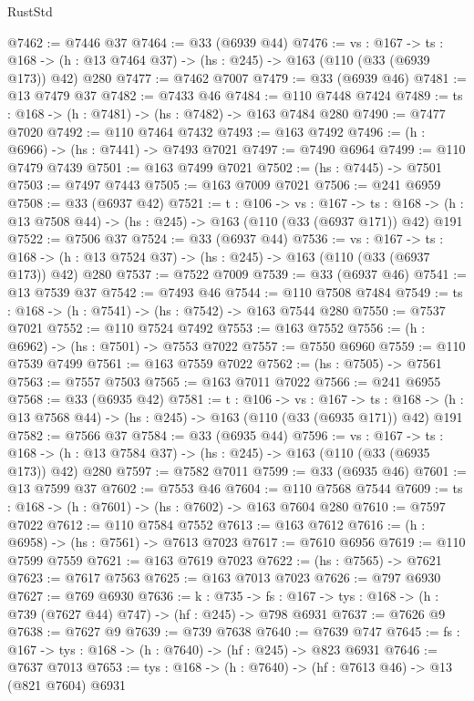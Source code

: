 \begin{lexlean}{RustStd}
\begin{coremodule}
@7462 := @7446 @37
@7464 := @33 (@6939 @44)
@7476 := {vs : @167} ->
  {ts : @168} -> (h : @13 @7464 @37) -> (hs : @245) -> @163 (@110 (@33 (@6939 @173)) @42) @280
@7477 := @7462 @7007
@7479 := @33 (@6939 @46)
@7481 := @13 @7479 @37
@7482 := @7433 @46
@7484 := @110 @7448 @7424
@7489 := {ts : @168} -> (h : @7481) -> (hs : @7482) -> @163 @7484 @280
@7490 := @7477 @7020
@7492 := @110 @7464 @7432
@7493 := @163 @7492
@7496 := (h : @6966) -> (hs : @7441) -> @7493 @7021
@7497 := @7490 @6964
@7499 := @110 @7479 @7439
@7501 := @163 @7499 @7021
@7502 := (hs : @7445) -> @7501
@7503 := @7497 @7443
@7505 := @163 @7009 @7021
@7506 := @241 @6959
@7508 := @33 (@6937 @42)
@7521 := {t : @106} ->
  {vs : @167} ->
  {ts : @168} -> (h : @13 @7508 @44) -> (hs : @245) -> @163 (@110 (@33 (@6937 @171)) @42) @191
@7522 := @7506 @37
@7524 := @33 (@6937 @44)
@7536 := {vs : @167} ->
  {ts : @168} -> (h : @13 @7524 @37) -> (hs : @245) -> @163 (@110 (@33 (@6937 @173)) @42) @280
@7537 := @7522 @7009
@7539 := @33 (@6937 @46)
@7541 := @13 @7539 @37
@7542 := @7493 @46
@7544 := @110 @7508 @7484
@7549 := {ts : @168} -> (h : @7541) -> (hs : @7542) -> @163 @7544 @280
@7550 := @7537 @7021
@7552 := @110 @7524 @7492
@7553 := @163 @7552
@7556 := (h : @6962) -> (hs : @7501) -> @7553 @7022
@7557 := @7550 @6960
@7559 := @110 @7539 @7499
@7561 := @163 @7559 @7022
@7562 := (hs : @7505) -> @7561
@7563 := @7557 @7503
@7565 := @163 @7011 @7022
@7566 := @241 @6955
@7568 := @33 (@6935 @42)
@7581 := {t : @106} ->
  {vs : @167} ->
  {ts : @168} -> (h : @13 @7568 @44) -> (hs : @245) -> @163 (@110 (@33 (@6935 @171)) @42) @191
@7582 := @7566 @37
@7584 := @33 (@6935 @44)
@7596 := {vs : @167} ->
  {ts : @168} -> (h : @13 @7584 @37) -> (hs : @245) -> @163 (@110 (@33 (@6935 @173)) @42) @280
@7597 := @7582 @7011
@7599 := @33 (@6935 @46)
@7601 := @13 @7599 @37
@7602 := @7553 @46
@7604 := @110 @7568 @7544
@7609 := {ts : @168} -> (h : @7601) -> (hs : @7602) -> @163 @7604 @280
@7610 := @7597 @7022
@7612 := @110 @7584 @7552
@7613 := @163 @7612
@7616 := (h : @6958) -> (hs : @7561) -> @7613 @7023
@7617 := @7610 @6956
@7619 := @110 @7599 @7559
@7621 := @163 @7619 @7023
@7622 := (hs : @7565) -> @7621
@7623 := @7617 @7563
@7625 := @163 @7013 @7023
@7626 := @797 @6930
@7627 := @769 @6930
@7636 := {k : @735} ->
  {fs : @167} -> {tys : @168} -> (h : @739 (@7627 @44) @747) -> (hf : @245) -> @798 @6931
@7637 := @7626 @9
@7638 := @7627 @9
@7639 := @739 @7638
@7640 := @7639 @747
@7645 := {fs : @167} -> {tys : @168} -> (h : @7640) -> (hf : @245) -> @823 @6931
@7646 := @7637 @7013
@7653 := {tys : @168} -> (h : @7640) -> (hf : @7613 @46) -> @13 (@821 @7604) @6931

\end{coremodule}
\end{lexlean}
